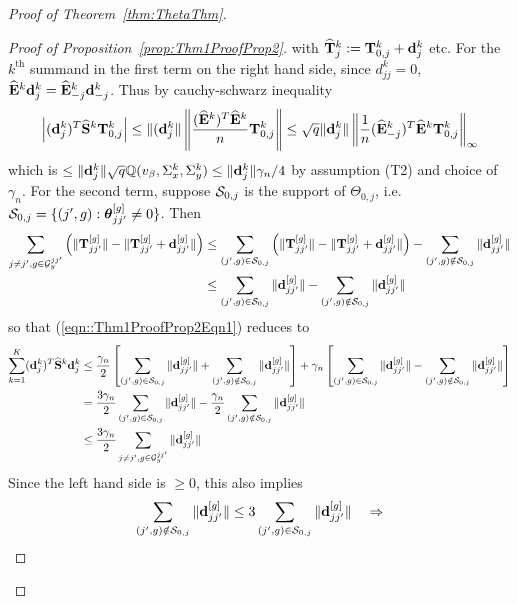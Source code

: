 \documentclass[12pt, letterpaper]{article}
\numberwithin{equation}{section}
\begin{document}
\begin{proof}[Proof of Theorem~\ref{thm:ThetaThm}]
\begin{proof}[Proof of Proposition~\ref{prop:Thm1ProofProp2}]
%
with $\widehat {{\mathbf{T}}}_j^k := {\mathbf{T}}_{0,j}^k + {\bf{d}}_{j}^k$ etc. For the $k^\text{th}$ summand in the first term on the right hand side, since $d_{jj}^k = 0$, $\widehat {{\mathbf{E}}}^k {\bf{d}}_j^k = \widehat {{\mathbf{E}}}_{-j}^k {\bf{d}}_{-j}^k$. Thus by cauchy-schwarz inequality
%
$$
\left| ({\bf{d}}_j^k)^T \widehat {{\mathbf{S}}}^k {\mathbf{T}}_{0,j}^k \right| \leq
\| ({\bf{d}}_j^k \| \left\| \frac{ (\widehat {{\mathbf{E}}}^k)^T \widehat {{\mathbf{E}}}^k }{n} {\mathbf{T}}_{0,j}^k \right\| \leq
\sqrt{q} \| {\bf{d}}_j^k \| \left\| \frac{1}{n} (\widehat {{\mathbf{E}}}_{-j}^k)^T \widehat {{\mathbf{E}}}^k {\mathbf{T}}_{0,j}^k \right\|_\infty
$$
%
which is $\leq \| {\bf{d}}_j^k\| \sqrt q {\mathbb{Q}}(v_\beta, \Sigma_x^k, \Sigma_y^k) \leq \| {\bf{d}}_j^k\| \gamma_n/4 $ by assumption (T2) and choice of $\gamma_n$. For the second term, 
suppose ${\cal{S}}_{0,j}$ is the support of $\Theta_{0,j}$, i.e. ${\cal{S}}_{0,j} = \{ (j',g): {\boldsymbol{\theta}}_{jj'}^{[g]} \neq 0 \}$. Then
%
\begin{align*}
\sum_{j \neq j', g \in {\cal{G}}_y^{jj'}} \left( \| {\mathbf{T}}_{jj'}^{[g]} \| -  \| {\mathbf{T}}_{jj'}^{[g]} + {\bf{d}}_{jj'}^{[g]}\| \right) & \leq
\sum_{(j',g) \in {\cal{S}}_{0,j}} \left( \| {\mathbf{T}}_{jj'}^{[g]} \| -  \| {\mathbf{T}}_{jj'}^{[g]} + {\bf{d}}_{jj'}^{[g]}\| \right) -
\sum_{(j',g) \notin {\cal{S}}_{0,j}} \| {\bf{d}}_{jj'}^{[g]} \|\\
& \leq \sum_{(j',g) \in {\cal{S}}_{0,j}} \| {\bf{d}}_{jj'}^{[g]} \| - \sum_{(j',g) \notin {\cal{S}}_{0,j}} \| {\bf{d}}_{jj'}^{[g]} \|
\end{align*}
so that (\ref{eqn::Thm1ProofProp2Eqn1}) reduces to
%
\begin{align}\label{eqn:Thm1ProofProp2Eqn3}
\sum_{k=1}^K ({\bf{d}}_j^k)^T \widehat {{\mathbf{S}}}^k {\bf{d}}_j^k & \leq 
\frac{\gamma_n}{2} \left[ \sum_{(j',g) \in {\cal{S}}_{0,j}} \| {\bf{d}}_{jj'}^{[g]} \| + \sum_{(j',g) \notin {\cal{S}}_{0,j}} \| {\bf{d}}_{jj'}^{[g]} \| \right] +
\gamma_n \left[ \sum_{(j',g) \in {\cal{S}}_{0,j}} \| {\bf{d}}_{jj'}^{[g]} \| - \sum_{(j',g) \notin {\cal{S}}_{0,j}} \| {\bf{d}}_{jj'}^{[g]} \| \right] \notag\\
& = \frac{3 \gamma_n}{2} \sum_{(j',g) \in {\cal{S}}_{0,j}} \| {\bf{d}}_{jj'}^{[g]} \| - \frac{\gamma_n}{2} \sum_{(j',g) \notin {\cal{S}}_{0,j}} \| {\bf{d}}_{jj'}^{[g]} \| \notag\\
& \leq \frac{3 \gamma_n}{2} \sum_{j \neq j', g \in {\cal{G}}_y^{jj'}} \| {\bf{d}}_{jj'}^{[g]} \|
\end{align}
%
Since the left hand side is $\geq 0$, this also implies
%
$$
\sum_{(j',g) \notin {\cal{S}}_{0,j}} \| {\bf{d}}_{jj'}^{[g]} \| \leq 3 \sum_{(j',g) \in {\cal{S}}_{0,j}} \| {\bf{d}}_{jj'}^{[g]} \| \quad \Rightarrow
$$
\end{proof}
\end{proof}
\end{document}
